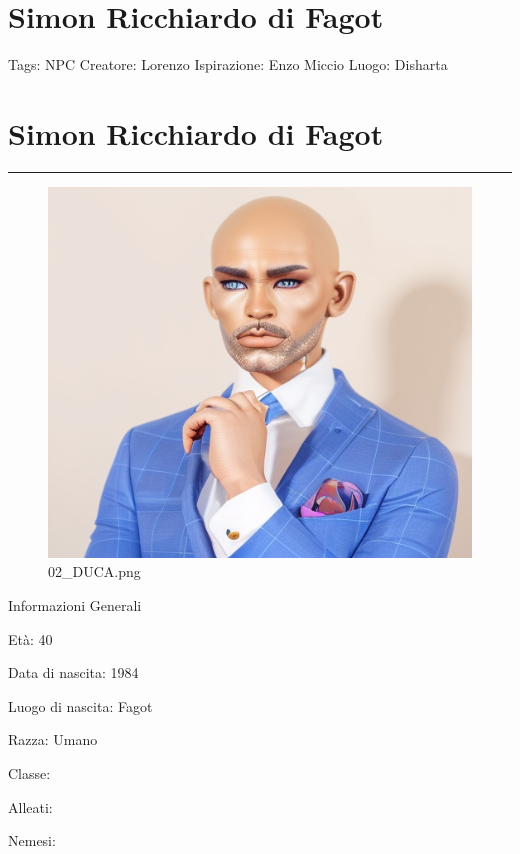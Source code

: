 \section{Simon Ricchiardo di Fagot}\label{simon-ricchiardo-di-fagot}

Tags: NPC Creatore: Lorenzo Ispirazione: Enzo Miccio Luogo: Disharta

\section{\texorpdfstring{\textbf{Simon Ricchiardo di
Fagot}}{Simon Ricchiardo di Fagot}}\label{simon-ricchiardo-di-fagot-1}

\begin{center}\rule{0.5\linewidth}{0.5pt}\end{center}

\begin{figure}
\centering
\includegraphics{02_DUCA.png}
\caption{02\_DUCA.png}
\end{figure}

Informazioni Generali

Età: 40

Data di nascita: 1984

Luogo di nascita: Fagot

Razza: Umano

Classe:

Alleati:

Nemesi:

